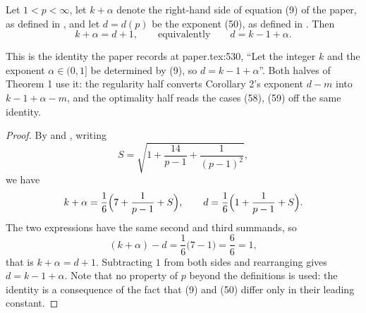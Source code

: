 \begin{lemma}
Let $1<p<\infty$, let $k+\alpha$ denote the right-hand side of equation (9) of
the paper, as defined in , and let $d=d(p)$ be the exponent
(50), as defined in .  Then
\[
  k+\alpha=d+1,\qquad\text{equivalently}\qquad d=k-1+\alpha .
\]

This is the identity the paper records at paper.tex:530, ``Let the integer $k$
and the exponent $\alpha\in(0,1]$ be determined by (9), so $d=k-1+\alpha$''.
Both halves of Theorem 1 use it: the regularity half converts Corollary 2's
exponent $d-m$ into $k-1+\alpha-m$, and the optimality half reads the cases
(58), (59) off the same identity.
\end{lemma}
\begin{proof}
By  and , writing
\[
  S=\sqrt{1+\frac{14}{p-1}+\frac{1}{(p-1)^2}},
\]
we have
\[
  k+\alpha=\frac{1}{6}\Bigl(7+\frac{1}{p-1}+S\Bigr),
  \qquad
  d=\frac{1}{6}\Bigl(1+\frac{1}{p-1}+S\Bigr).
\]
The two expressions have the same second and third summands, so
\[
  (k+\alpha)-d=\frac{1}{6}\bigl(7-1\bigr)=\frac{6}{6}=1 ,
\]
that is $k+\alpha=d+1$.  Subtracting $1$ from both sides and rearranging gives
$d=k-1+\alpha$.  Note that no property of $p$ beyond the definitions is used:
the identity is a consequence of the fact that (9) and (50) differ only in
their leading constant.
\end{proof}
